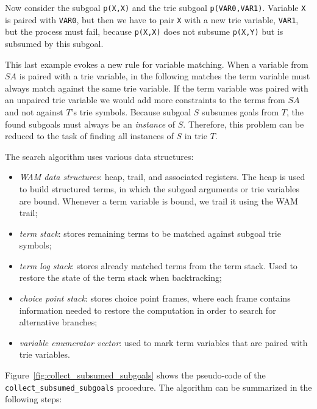 Now consider the subgoal \texttt{p(X,X)} and the trie subgoal \texttt{p(VAR0,VAR1)}.
Variable \texttt{X} is paired with \texttt{VAR0}, but then we have to pair \texttt{X}
with a new trie variable, \texttt{VAR1}, but the process must fail, because \texttt{p(X,X)}
does not subsume \texttt{p(X,Y)} but is subsumed by this subgoal.

This last example evokes a new rule for variable matching. When a variable from $SA$ is paired
with a trie variable, in the following matches the term variable must always match against
the same trie variable. If the term variable was paired with an unpaired trie variable we would add more
constraints to the terms from $SA$ and not against $T$'s trie symbols. Because subgoal $S$
subsumes goals from $T$, the found subgoals must always be an \emph{instance} of $S$.
Therefore, this problem can be reduced to the task of finding all instances of $S$ in trie $T$.

The search algorithm uses various data structures:

\begin{itemize}
  \item \textit{WAM data structures}: heap, trail, and associated registers. The heap is used to
  build structured terms, in which the subgoal arguments or trie variables are bound. Whenever a
  term variable is bound, we trail it using the WAM trail;
  
  \item \textit{term stack}: stores remaining terms to be matched against subgoal trie symbols;
  
  \item \textit{term log stack}: stores already matched terms from the term stack. Used to
  restore the state of the term stack when backtracking;
  
  \item \textit{choice point stack}: stores choice point frames, where each frame contains
  information needed to restore the computation in order to search for alternative branches;
  
  \item \textit{variable enumerator vector}: used to mark term variables that are paired with
  trie variables.
\end{itemize}

Figure~\ref{fig:collect_subsumed_subgoals} shows the pseudo-code of the \texttt{collect\_subsumed\_subgoals}
procedure. The algorithm can be summarized in the following steps:

